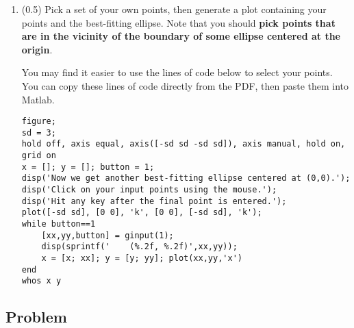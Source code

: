 \documentclass[11pt,titlepage,fleqn]{article}
\begin{document}
\begin{enumerate}
\begin{enumerate}

\item (0.0) Check that the result is the same as if you simply use the ``\verb+\+'' command: \verb+m = G\d+.

\item (0.5) Produce a plot showing both the data and the best-fitting ellipse.

\end{enumerate}


\item (0.5) Pick a set of your own points, then generate a plot containing your points and the best-fitting ellipse. Note that you should {\bf pick points that are in the vicinity of the boundary of some ellipse centered at the origin}.

You may find it easier to use the lines of code below to select your points. You can copy these lines of code directly from the PDF, then paste them into Matlab.

\small
\begin{spacing}{1.0}
\begin{verbatim}
figure;
sd = 3;
hold off, axis equal, axis([-sd sd -sd sd]), axis manual, hold on, grid on
x = []; y = []; button = 1;
disp('Now we get another best-fitting ellipse centered at (0,0).');
disp('Click on your input points using the mouse.');
disp('Hit any key after the final point is entered.');
plot([-sd sd], [0 0], 'k', [0 0], [-sd sd], 'k');
while button==1
    [xx,yy,button] = ginput(1);
    disp(sprintf('    (%.2f, %.2f)',xx,yy));
    x = [x; xx]; y = [y; yy]; plot(xx,yy,'x')
end
whos x y
\end{verbatim}
\end{spacing}

\end{enumerate}


\subsection*{Problem} \howmuchtime\




\end{document}
